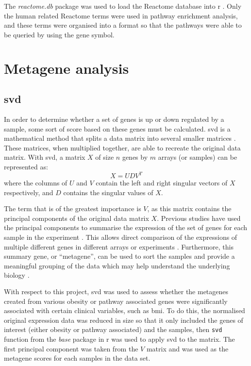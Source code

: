 The \textit{reactome.db} package was used to load the Reactome database into \gls{r} \citep{reactome}.
Only the human related Reactome terms were used in pathway enrichment analysis, and these terms were organised into a format so that the pathways were able to be queried by using the gene symbol.

\section{Metagene analysis}
\label{sec:metagene_analysis}

\subsection{\Gls{svd}}
\label{sub:svd}

In order to determine whether a set of genes is up or down regulated by a sample, some sort of score based on these genes must be calculated.
\Gls{svd} is a mathematical method that splits a data matrix into several smaller matrices \citep{Golub1970}.
These matrices, when multiplied together, are able to recreate the original data matrix.
With \gls{svd}, a matrix $X$ of size $n$ genes by $m$ arrays (or samples) can be represented as:
\begin{equation}
	\label{eq:svd}
	X = UDV^T
\end{equation}
where the columns of $U$ and $V$ contain the left and right singular vectors of $X$ respectively, and $D$ contains the singular values of $X$.

The term that is of the greatest importance is $V$, as this matrix contains the principal components of the original data matrix $X$.
Previous studies have used the principal components to summarise the expression of the set of genes for each sample in the experiment \citep{Alter2000,West2001}.
This allows direct comparison of the expressions of multiple different genes in different arrays or experiments \citep{Alter2000}.
Furthermore, this summary gene, or ``metagene'', can be used to sort the samples and provide a meaningful grouping of the data which may help understand the underlying biology \citep{Alter2000}.

With respect to this project, \gls{svd} was used to assess whether the metagenes created from various obesity or pathway associated genes were significantly associated with certain clinical variables, such as \gls{bmi}.
To do this, the normalised original expression data was reduced in size so that it only included the genes of interest (either obesity or pathway associated) and the samples, then \texttt{svd} function from the \textit{base} package in \gls{r} was used to apply \gls{svd} to the matrix.
The first principal component was taken from the $V$ matrix and was used as the metagene scores for each samples in the data set.

